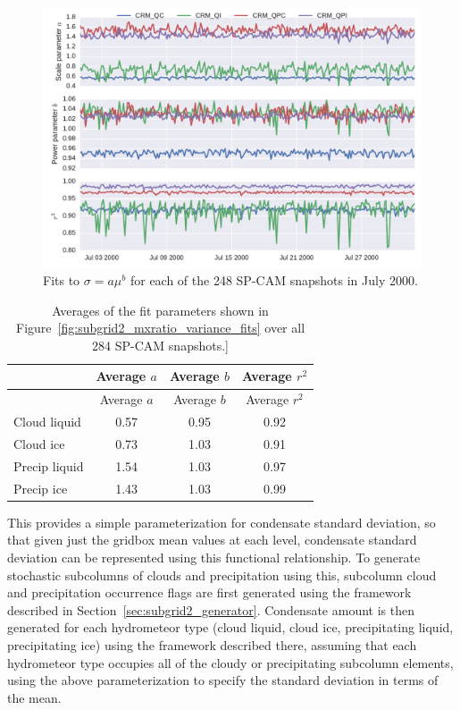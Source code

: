 \begin{figure}[htbp]
\centering
\includegraphics{graphics/subgrid2_mxratio_variance_fits.pdf}
\caption{\label{fig:subgrid2_mxratio_variance_fits}Fits to
\(\sigma = a \mu^b\) for each of the 248 SP-CAM snapshots in July
2000.}\label{fig:subgrid2ux5fmxratioux5fvarianceux5ffits}
\end{figure}

\begin{longtable}[]{@{}lccc@{}}
\caption{\label{tbl:subgrid2_mxratio_variance_fits_table}Averages of the
fit parameters shown in Figure~\ref{fig:subgrid2_mxratio_variance_fits}
over all 284 SP-CAM snapshots.{]} }\tabularnewline
\toprule
& Average \(a\) & Average \(b\) & Average \(r^2\)\tabularnewline
\midrule
\endfirsthead
\toprule
& Average \(a\) & Average \(b\) & Average \(r^2\)\tabularnewline
\midrule
\endhead
Cloud liquid & 0.57 & 0.95 & 0.92\tabularnewline
Cloud ice & 0.73 & 1.03 & 0.91\tabularnewline
Precip liquid & 1.54 & 1.03 & 0.97\tabularnewline
Precip ice & 1.43 & 1.03 & 0.99\tabularnewline
\bottomrule
\end{longtable}

This provides a simple parameterization for condensate standard
deviation, so that given just the gridbox mean values at each level,
condensate standard deviation can be represented using this functional
relationship. To generate stochastic subcolumns of clouds and
precipitation using this, subcolumn cloud and precipitation occurrence
flags are first generated using the framework described in
Section~\ref{sec:subgrid2_generator}. Condensate amount is then
generated for each hydrometeor type (cloud liquid, cloud ice,
precipitating liquid, precipitating ice) using the framework described
there, assuming that each hydrometeor type occupies all of the cloudy or
precipitating subcolumn elements, using the above parameterization to
specify the standard deviation in terms of the mean.


